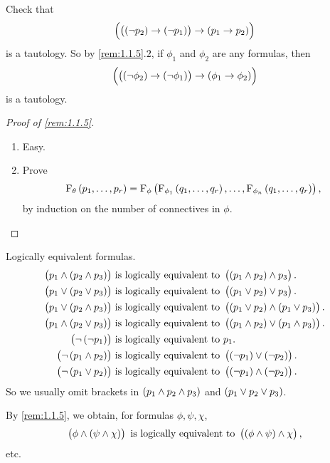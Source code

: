 \pagebreak

\begin{example}
Check that
$$ \impb{\impb{\notb{p_2}}{\notb{p_1}}}{\impb{p_1}{p_2}} $$
is a tautology. So by \ref{rem:1.1.5}.$ 2 $, if $ \phi_1 $ and $ \phi_2 $ are any formulas, then
$$ \impb{\impb{\notb{\phi_2}}{\notb{\phi_1}}}{\impb{\phi_1}{\phi_2}} $$
is a tautology.
\end{example}

\begin{proof}[Proof of \ref{rem:1.1.5}]
\hfill
\begin{enumerate}
\item Easy.
\item Prove
$$ \F_\theta\br{p_1, \dots, p_r} = \F_\phi\br{\F_{\phi_1}\br{q_1, \dots, q_r}, \dots, \F_{\phi_n}\br{q_1, \dots, q_r}}, $$
by induction on the number of connectives in $ \phi $.
\end{enumerate}
\end{proof}

\begin{example*}
Logically equivalent formulas.
\begin{align*}
\andb{p_1}{\andb{p_2}{p_3}} \ & \text{is logically equivalent to} \ \andb{\andb{p_1}{p_2}}{p_3}. \\
\orb{p_1}{\orb{p_2}{p_3}} \ & \text{is logically equivalent to} \ \orb{\orb{p_1}{p_2}}{p_3}. \\
\orb{p_1}{\andb{p_2}{p_3}} \ & \text{is logically equivalent to} \ \andb{\orb{p_1}{p_2}}{\orb{p_1}{p_3}}. \\
\andb{p_1}{\orb{p_2}{p_3}} \ & \text{is logically equivalent to} \ \orb{\andb{p_1}{p_2}}{\andb{p_1}{p_3}}. \\
\notb{\notb{p_1}} \ & \text{is logically equivalent to} \ p_1. \\
\notb{\andb{p_1}{p_2}} \ & \text{is logically equivalent to} \ \orb{\notb{p_1}}{\notb{p_2}}. \\
\notb{\orb{p_1}{p_2}} \ & \text{is logically equivalent to} \ \andb{\notb{p_1}}{\notb{p_2}}.
\end{align*}
So we usually omit brackets in $ \br{p_1 \land p_2 \land p_3} $ and $ \br{p_1 \lor p_2 \lor p_3} $.
\end{example*}

\begin{note*}
By \ref{rem:1.1.5}, we obtain, for formulas $ \phi, \psi, \chi $,
$$ \andb{\phi}{\andb{\psi}{\chi}} \ \text{is logically equivalent to} \ \andb{\andb{\phi}{\psi}}{\chi}, $$
etc.
\end{note*}

